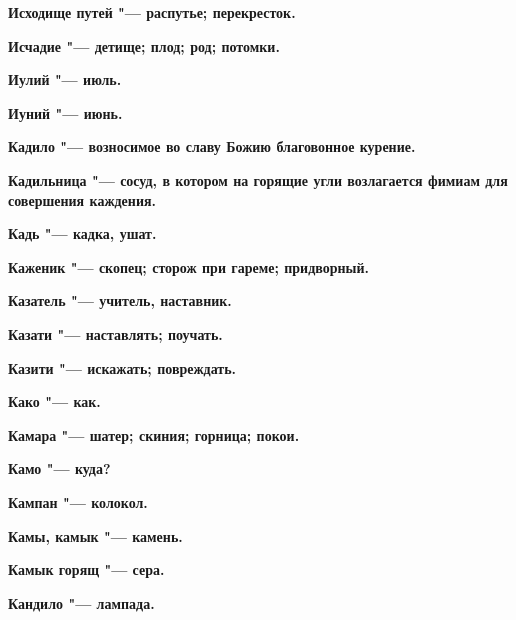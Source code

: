 \bfseries Исходище путей \normalfont{} "--- распутье; перекресток. 




\bfseries Исчадие \normalfont{} "--- детище; плод; род; потомки. 




\bfseries Иулий \normalfont{} "--- июль. 




\bfseries Иуний \normalfont{} "--- июнь. 




 





\bfseries Кадило \normalfont{} "--- возносимое во славу Божию благовонное курение. 




\bfseries Кадильница \normalfont{} "--- сосуд, в котором на горящие угли возлагается фимиам для совершения каждения. 




\bfseries Кадь \normalfont{} "--- кадка, ушат. 




\bfseries Каженик \normalfont{} "--- скопец; сторож при гареме; придворный. 




\bfseries Казатель \normalfont{} "--- учитель, наставник. 




\bfseries Казати \normalfont{} "--- наставлять; поучать. 




\bfseries Казити \normalfont{} "--- искажать; повреждать. 




\bfseries Како \normalfont{} "--- как. 




\bfseries Камара \normalfont{} "--- шатер; скиния; горница; покои. 




\bfseries Камо \normalfont{} "--- куда? 




\bfseries Кампан \normalfont{} "--- колокол. 




\bfseries Камы, камык \normalfont{} "--- камень. 




\bfseries Камык горящ \normalfont{} "--- сера. 




\bfseries Кандило \normalfont{} "--- лампада. 




